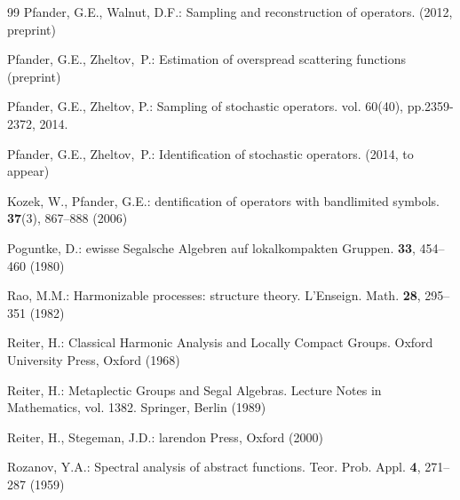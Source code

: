\documentclass[graybox]{svmult}
\begin{document}
\begin{thebibliography}{99}
Pfander, G.E.,  Walnut, D.F.:
\newblock  Sampling and reconstruction of operators.
(2012, preprint)




Pfander, G.E.,   Zheltov,~P.:
Estimation of overspread scattering functions
\newblock ({p}reprint) %


Pfander, G.E.,  Zheltov, P.:
\newblock  Sampling of stochastic operators.
vol. 60(40), pp.2359-2372, 2014.

Pfander, G.E.,  Zheltov,~P.:
\newblock Identification of stochastic operators.
 (2014, to appear)
\newblock

Kozek, W.,  Pfander, G.E.:
dentification of operators with bandlimited symbols.
 {\bf 37}(3), 867--888 (2006)

{P}oguntke, D.:
ewisse {S}egalsche {A}lgebren auf lokalkompakten {G}ruppen.
 {\bf 33}, 454--460 (1980)

 Rao, M.M.: Harmonizable processes:  structure
   theory.  L'Enseign.  Math.  {\bf 28}, 295--351 (1982)

 Reiter, H.: Classical Harmonic Analysis and
Locally Compact Groups. Oxford University Press, Oxford (1968)

 Reiter, H.: Metaplectic Groups and Segal Algebras.
   Lecture Notes in Mathematics, vol. 1382. Springer,
   Berlin (1989)

{R}eiter, H.,  {S}tegeman, J.D.:
larendon {P}ress, {O}xford  (2000)

 Rozanov, Y.A.: Spectral analysis of abstract
   functions.  Teor.  Prob.  Appl.  {\bf 4},  271--287 (1959)


\end{thebibliography}
\end{document}
